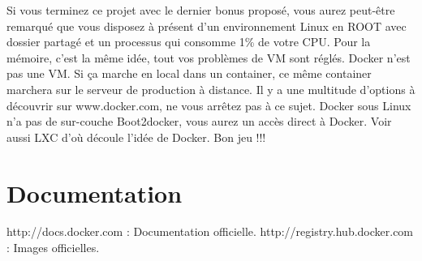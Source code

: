 \documentclass{42}
\begin{document}
Si vous terminez ce projet avec le dernier bonus proposé, vous aurez peut-être remarqué que vous disposez à présent d’un environnement Linux en ROOT avec dossier partagé et un processus qui consomme 1\% de votre CPU. Pour la mémoire, c’est la même idée, tout vos problèmes de VM sont réglés.
\newline
\newline
Docker n’est pas une VM.
\newline
\newline
Si ça marche en local dans un container, ce même container marchera sur le serveur de production à distance.
\newline
\newline
Il y a une multitude d’options à découvrir sur www.docker.com, ne vous arrêtez pas à ce sujet.
Docker sous Linux n’a pas de sur-couche Boot2docker, vous aurez un accès direct à Docker.
\newline
\newline
Voir aussi LXC d’où découle l'idée de Docker.
\newline
\newline
\newline
\newline
Bon jeu !!!

\section{Documentation}
\info
{
	http://docs.docker.com			: Documentation officielle. 
	\newline
	http://registry.hub.docker.com	: Images officielles. 
}

\end{document}
